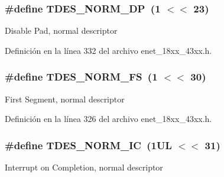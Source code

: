 \subsubsection[{\texorpdfstring{T\+D\+E\+S\+\_\+\+N\+O\+R\+M\+\_\+\+DP}{TDES_NORM_DP}}]{\setlength{\rightskip}{0pt plus 5cm}\#define T\+D\+E\+S\+\_\+\+N\+O\+R\+M\+\_\+\+DP~(1 $<$$<$ 23)}\hypertarget{group___e_n_e_t__18_x_x__43_x_x_ga68df1378871eaf9b4131844caa0130e2}{}\label{group___e_n_e_t__18_x_x__43_x_x_ga68df1378871eaf9b4131844caa0130e2}
Disable Pad, normal descriptor 

Definición en la línea 332 del archivo enet\+\_\+18xx\+\_\+43xx.\+h.

\subsubsection[{\texorpdfstring{T\+D\+E\+S\+\_\+\+N\+O\+R\+M\+\_\+\+FS}{TDES_NORM_FS}}]{\setlength{\rightskip}{0pt plus 5cm}\#define T\+D\+E\+S\+\_\+\+N\+O\+R\+M\+\_\+\+FS~(1 $<$$<$ 30)}\hypertarget{group___e_n_e_t__18_x_x__43_x_x_ga346a00e467b947079124c0161a2fff46}{}\label{group___e_n_e_t__18_x_x__43_x_x_ga346a00e467b947079124c0161a2fff46}
First Segment, normal descriptor 

Definición en la línea 326 del archivo enet\+\_\+18xx\+\_\+43xx.\+h.

\subsubsection[{\texorpdfstring{T\+D\+E\+S\+\_\+\+N\+O\+R\+M\+\_\+\+IC}{TDES_NORM_IC}}]{\setlength{\rightskip}{0pt plus 5cm}\#define T\+D\+E\+S\+\_\+\+N\+O\+R\+M\+\_\+\+IC~(1\+U\+L $<$$<$ 31)}\hypertarget{group___e_n_e_t__18_x_x__43_x_x_ga21496a89382ca356ff40d5f0e5fb62f9}{}\label{group___e_n_e_t__18_x_x__43_x_x_ga21496a89382ca356ff40d5f0e5fb62f9}
Interrupt on Completion, normal descriptor 


